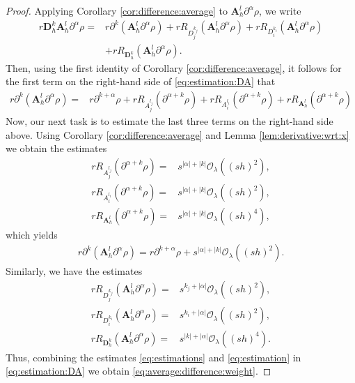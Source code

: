 \documentclass[11pt,oneside,leqno]{amsart}
\numberwithin{equation}{section}
\numberwithin{equation}{section}
\begin{document}
\begin{proof}
Applying Corollary \ref{cor:difference:average} to $\mathbf{A}_{h}^{l}\partial^{\alpha}\rho$, we write
\begin{equation}\label{eq:estimation:DA}
\begin{aligned}
r\mathbf{D}_{h}^{k}\mathbf{A}_{h}^{l}\partial^{\alpha}\rho=& r\partial^{k}(\mathbf{A}_{h}^{l}\partial^{\alpha}\rho)+rR_{D^{k_{j}}_{j}}(\mathbf{A}_{h}^{l}\partial^{\alpha}\rho)+rR_{D^{k_{i
}}_{i}}(\mathbf{A}_{h}^{l}\partial^{\alpha}\rho)\\
&+rR_{\mathbf{D}_{h}^{k}}(\mathbf{A}_{h}^{l}\partial^{\alpha}\rho).
\end{aligned}
\end{equation}
Then, using the first identity of Corollary \ref{cor:difference:average}, it follows for the first term on the right-hand side of \eqref{eq:estimation:DA} that
\begin{align*}
r\partial^{k}(\mathbf{A}_{h}^{l}\partial^{\alpha}\rho)=&r\partial^{k+\alpha}\rho+rR_{A_{j}^{l_{j}}}(\partial^{\alpha+k}\rho)+rR_{A_{i}^{l_{i}}}(\partial^{\alpha+k}\rho)+rR_{\mathbf{A}_{h}^{l}}(\partial^{\alpha+k}\rho)
\end{align*}
Now, our next task is to estimate the last three terms on the right-hand side above. Using Corollary \ref{cor:difference:average} and Lemma \ref{lem:derivative:wrt:x} we obtain the estimates
\begin{align*}
    rR_{A_{j}^{l_{j}}}(\partial^{\alpha+k}\rho)=&s^{|\alpha|+|k|}\mathcal{O}_{\lambda}((sh)^{2}),\\
    rR_{A_{i}^{l_{i}}}(\partial^{\alpha+k}\rho)=&s^{|\alpha|+|k|}\mathcal{O}_{\lambda}((sh)^{2}),\\
    rR_{\mathbf{A}_{h}^{l}}(\partial^{\alpha+k}\rho)=&s^{|\alpha|+|k|}\mathcal{O}_{\lambda}((sh)^{4}),
\end{align*}
which  yields 
\begin{align}\label{eq:estimation}
    r\partial^{k}(\mathbf{A}_{h}^{l}\partial^{\alpha}\rho)=r\partial^{k+\alpha}\rho+s^{|\alpha|+|k|}\mathcal{O}_{\lambda}((sh)^{2}).
\end{align} 
Similarly, we have the estimates 
\begin{equation}\label{eq:estimations}
\begin{aligned}
    rR_{D^{k_{j}}_{j}}(\mathbf{A}_{h}^{l}\partial^{\alpha}\rho)=&s^{k_{j}+|\alpha|}\mathcal{O}_{\lambda}((sh)^{2}),\\
    rR_{D^{k_{i}}_{i}}(\mathbf{A}_{h}^{l}\partial^{\alpha}\rho)=&s^{k_{i}+|\alpha|}\mathcal{O}_{\lambda}((sh)^{2}),\\
    rR_{\mathbf{D}_{h}^{k}}(\mathbf{A}_{h}^{l}\partial^{\alpha}\rho)=&s^{|k|+|\alpha|}\mathcal{O}_{\lambda}((sh)^{4}).
\end{aligned}
\end{equation}
Thus, combining the estimates \eqref{eq:estimations} and \eqref{eq:estimation} in \eqref{eq:estimation:DA} we obtain \eqref{eq:average:difference:weight}.
\end{proof}
\end{document}
